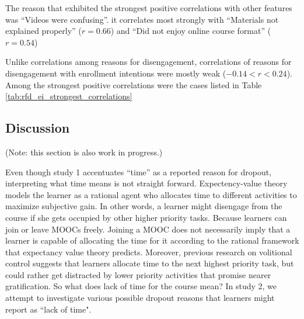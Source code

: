 \documentclass{sigchi}\usepackage[]{graphicx}\usepackage[]{color}
\begin{document}
The reason that exhibited the strongest positive correlations with other features was ``Videos were confusing''. it correlates most strongly with ``Materials not explained properly'' ($r=0.66$) and ``Did not enjoy online course format'' ($r=0.54$)

Unlike correlations among reasons for disengagement, correlations of reasons for disengagement with enrollment intentions were mostly weak ($-0.14 < r < 0.24$). Among the strongest positive correlations were the cases listed in Table \ref{tab:rfd_ei_strongest_correlations}


\subsection{Discussion}

(Note: this section is also work in progress.)

Even though study 1 accentuates ``time'' as a reported reason for dropout, interpreting what time means is not straight forward. Expectency-value theory models the learner as a rational agent who allocates time to different activities to maximize subjective gain. In other words, a learner might disengage from the course if she gets occupied by other higher priority tasks. Because learners can join or leave MOOCs freely. Joining a MOOC does not necessarily imply that a learner is capable of allocating the time for it according to the rational framework that expectancy value theory predicts. Moreover, previous research on volitional control suggests that learners allocate time to the next highest priority task, but could rather get distracted by lower priority activities that promise nearer gratification. So what does lack of time for the course mean? In study 2, we attempt to investigate various possible dropout reasons that learners might report as ``lack of time".
\end{document}
